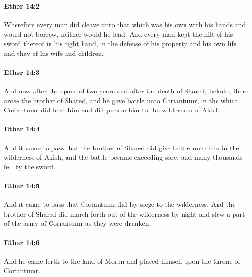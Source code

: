 		\paragraph{Ether 14:2} %
			\label{ETHER-14-2}

			Wherefore every man did cleave
			unto that which was his own
			with his hands
			and would not borrow, neither would he lend.
			And every man kept the hilt of his sword thereof in his right hand,
			in the defense of his property
			and his own life and they of his wife and children.

		\paragraph{Ether 14:3} %
			\label{ETHER-14-3}

			And now after the space of two years and after the death of Shared,
			behold, there arose the brother of Shared,
			and he gave battle unto Coriantumr,
			in the which Coriantumr did beat him
			and did pursue him to the wilderness of Akish.

		\paragraph{Ether 14:4} %
			\label{ETHER-14-4}

			And it came to pass that
			the brother of Shared did give battle unto him in the wilderness of Akish,
			and the battle became exceeding sore;
			and many thousands fell by the sword.

		\paragraph{Ether 14:5} %
			\label{ETHER-14-5}

			And it came to pass that Coriantumr did lay siege to the wilderness.
			And the brother of Shared did march forth out of the wilderness by night
			and slew a part of the army of Coriantumr
			as they were drunken.

		\paragraph{Ether 14:6} %
			\label{ETHER-14-6}

			And he came forth to the land of Moron
			and placed himself upon the throne of Coriantumr.

